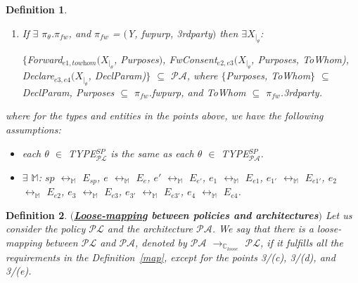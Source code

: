 \documentclass[a4paper]{article}
\newtheorem{ttd}{Definition}
\begin{document}
\begin{ttd}
\begin{enumerate}
\begin{enumerate}
\item $\pi_{del}$.\textit{how} = $($\textit{aut}, \textit{partly}, Y$)$ and $\pi_{del}$.\textit{gdeld} = $($$gd$, Y$)$ then $\exists$ $X_{|_{\theta}}$: 

$\{$\textit{Unregister}$_{e2,e3}$(\textit{pservices}, \textit{typeserv}), \textit{AutDelete}$_{e1}$$($$X_{|_{\theta}}$, $\{$E$_{Main_{sp}}$$\}$, $gd$$)$, \textit{Declare}$_{e3,e4}$$(X_{|_{\theta}}$, \textit{DeclParam})$\}$ $\subseteq$ $\mathcal{P}\mathcal{A}$, where $\{$E$_{Main_{sp}}$, $gd$$\}$ $\subseteq$ \textit{DeclParam}.
\end{enumerate}

\item If $\exists$ $\pi_{\theta}$.$\pi_{fw}$, and  
$\pi_{fw}$ = $($Y, \textit{fwpurp}, \textit{3rdparty}$)$ then $\exists$$X_{|_{\theta}}$: 

$\{$\textit{Forward}$_{e1,\textit{towhom}}$$($$X_{|_{\theta}}$, \textit{Purposes}$)$,  \textit{FwConsent}$_{e2,e3}$$($$X_{|_{\theta}}$, \textit{Purposes}, \textit{ToWhom}), \textit{Declare}$_{e3,e4}$$(X_{|_{\theta}}$,  \textit{DeclParam})$\}$ $\subseteq$ $\mathcal{P}\mathcal{A}$, where $\{$\textit{Purposes}, \textit{ToWhom}$\}$ $\subseteq$ \textit{DeclParam},  \textit{Purposes} $\subseteq$  $\pi_{fw}$.\textit{fwpurp}, and \textit{ToWhom} $\subseteq$ $\pi_{fw}$.\textit{3rdparty}.     
\end{enumerate}

\noindent where  for the types and entities in the points above, we have the following assumptions:

\begin{itemize}
\item each $\theta$ $\in$ \textit{TYPE}$^{SP}_{\mathcal{P}\mathcal{L}}$ is the same as each $\theta$ $\in$ \textit{TYPE}$^{SP}_{\mathcal{P}\mathcal{A}}$. 

\item  $\exists$ $\mathbb{M}$: $sp$ $\leftrightarrow_{\mathbb{M}}$ $E_{sp}$, $e$ $\leftrightarrow_{\mathbb{M}}$ $E_e$, $e'$ $\leftrightarrow_{\mathbb{M}}$ $E_{e'}$, $e_1$ $\leftrightarrow_{\mathbb{M}}$ $E_{e1}$, $e_{1'}$ $\leftrightarrow_{\mathbb{M}}$ $E_{e1'}$, $e_2$ $\leftrightarrow_{\mathbb{M}}$ $E_{e2}$,  $e_3$ $\leftrightarrow_{\mathbb{M}}$ $E_{e3}$, $e_{3'}$ $\leftrightarrow_{\mathbb{M}}$ $E_{e3'}$,  $e_4$ $\leftrightarrow_{\mathbb{M}}$ $E_{e4}$.
\end{itemize}

\end{ttd}

\begin{ttd} $($\textbf{\underline{Loose-mapping} between policies and architectures}$)$
\label{maploose} 
Let us consider the policy $\mathcal{P}\mathcal{L}$ and the architecture $\mathcal{P}\mathcal{A}$. We say that there is a loose-mapping between $\mathcal{P}\mathcal{L}$ and $\mathcal{P}\mathcal{A}$, denoted by $\mathcal{P}\mathcal{A}$ $\rightarrow_{\mathbb{C}_{loose}}$ $\mathcal{P}\mathcal{L}$, if it fulfills all the requirements in the Definition~\ref{map}, except for the points 3/(c), 3/(d), and 3/(e). 

\end{ttd}  
\end{document}
